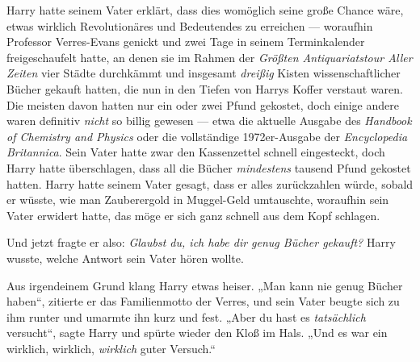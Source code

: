 Harry hatte seinem Vater erklärt, dass dies womöglich seine große Chance wäre, etwas wirklich Revolutionäres und Bedeutendes zu erreichen — woraufhin Professor Verres-Evans genickt und zwei Tage in seinem Terminkalender freigeschaufelt hatte, an denen sie im Rahmen der \emph{Größten Antiquariatstour Aller Zeiten} vier Städte durchkämmt und insgesamt \emph{dreißig} Kisten wissenschaftlicher Bücher gekauft hatten, die nun in den Tiefen von Harrys Koffer verstaut waren. Die meisten davon hatten nur ein oder zwei Pfund gekostet, doch einige andere waren definitiv \emph{nicht} so billig gewesen — etwa die aktuelle Ausgabe des \emph{Handbook of Chemistry and Physics} oder die vollständige 1972er-Ausgabe der \emph{Encyclopedia Britannica}. Sein Vater hatte zwar den Kassenzettel schnell eingesteckt, doch Harry hatte überschlagen, dass all die Bücher \emph{mindestens} tausend Pfund gekostet hatten. Harry hatte seinem Vater gesagt, dass er alles zurückzahlen würde, sobald er wüsste, wie man Zauberergold in Muggel-Geld umtauschte, woraufhin sein Vater erwidert hatte, das möge er sich ganz schnell aus dem Kopf schlagen.

Und jetzt fragte er also: \emph{Glaubst du, ich habe dir genug Bücher gekauft?} Harry wusste, welche Antwort sein Vater hören wollte.

Aus irgendeinem Grund klang Harry etwas heiser.
„Man kann nie genug Bücher haben“, zitierte er das Familienmotto der Verres, und sein Vater beugte sich zu ihm runter und umarmte ihn kurz und fest.
„Aber du hast es \emph{tatsächlich} versucht“, sagte Harry und spürte wieder den Kloß im Hals.
„Und es war ein wirklich, wirklich, \emph{wirklich} guter Versuch.“

